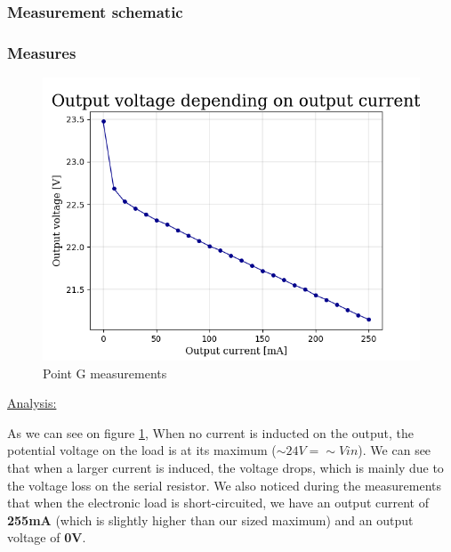 {\clearpage

\subsubsection{Measurement schematic}

\subsubsection{Measures}
\begin{figure}[h]
	\centering
	\includegraphics[width=0.8\linewidth]{../../Grph-pointG}
	\caption{Point G measurements}
	\label{fig:grph-pointg}
\end{figure}

\underline{Analysis:}

As we can see on figure \ref{fig:grph-pointg}, When no current is inducted on the output, the potential voltage on the load is at its maximum (\textbf{$\sim 24V = \sim Vin$}). We can see that when a larger current is induced, the voltage drops, which is mainly due to the voltage loss on the serial resistor. We also noticed during the measurements that when the electronic load is short-circuited, we have an output current of \textbf{255mA} (which is slightly higher than our sized maximum) and an output voltage of \textbf{0V}.


}

\newpage
